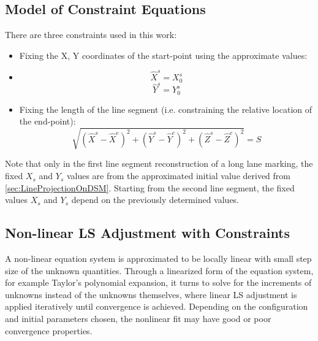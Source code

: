 \subsection{Model of Constraint Equations}
\label{subsec:ConEqua}
There are three constraints used in this work:
\begin{itemize}
\item Fixing the X, Y coordinates of the start-point using the approximate values:
\item [] \begin{equation} \label{eq:constraint1}
\hat{X}^s=X^s_0
\end{equation}
\begin{equation} \label{eq:constraint2}
\hat{Y}^s=Y^s_0
\end{equation}
\item Fixing the length of the line segment (i.e. constraining the relative location of the end-point):
\begin{equation} \label{eq:constraint3}
\sqrt{(\hat{X}^s-\hat{X}^e)^2+(\hat{Y}^s-\hat{Y}^e)^2+(\hat{Z}^s-\hat{Z}^e)^2}=S
\end{equation}
\end{itemize}

Note that only in the first line segment reconstruction of a long lane marking, the fixed $X_s$ and $Y_s$ values are from the approximated initial value derived from \cref{sec:LineProjectionOnDSM}. Starting from the second line segment, the fixed values $X_s$ and $Y_s$ depend on the previously determined values.


\subsection{Non-linear LS Adjustment with Constraints}
\label{subsec:LSadj}
%
A non-linear equation system is approximated to be locally linear with small step size of the unknown quantities. Through a linearized form of the equation system, for example Taylor's polynomial expansion, it turns to solve for the increments of unknowns instead of the unknowns themselves, where linear LS adjustment is applied iteratively until convergence is achieved. Depending on the configuration and initial parameters chosen, the nonlinear fit may have good or poor convergence properties.






